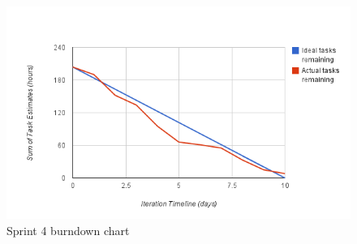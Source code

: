 \begin{figure}
	\begin{center}
		\includegraphics[width=15cm]{Pictures/Charts/Sprint4burndown}
	\end{center}
	\caption{Sprint 4 burndown chart}
	\label{fig:sprint4burndown}
\end{figure}

